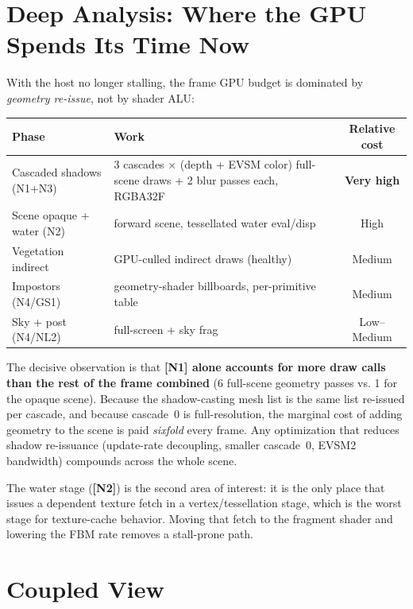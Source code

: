 \documentclass[a4paper,12pt]{article}
\begin{document}
\newpage

\section{Deep Analysis: Where the GPU Spends Its Time Now}

With the host no longer stalling, the frame GPU budget is dominated by
\emph{geometry re-issue}, not by shader ALU:

\begin{center}
\begin{tabular}{lp{7cm}c}
\toprule
\textbf{Phase} & \textbf{Work} & \textbf{Relative cost} \\
\midrule
Cascaded shadows (N1+N3) & 3 cascades × (depth + EVSM color) full-scene draws
  + 2 blur passes each, RGBA32F & \textbf{Very high} \\
Scene opaque + water (N2) & forward scene, tessellated water eval/disp & High \\
Vegetation indirect        & GPU-culled indirect draws (healthy) & Medium \\
Impostors (N4/GS1)         & geometry-shader billboards, per-primitive table & Medium \\
Sky + post (N4/NL2)        & full-screen + sky frag & Low--Medium \\
\bottomrule
\end{tabular}
\end{center}

\noindent The decisive observation is that \textbf{[N1] alone accounts for more
draw calls than the rest of the frame combined} (6 full-scene geometry passes vs.
1 for the opaque scene). Because the shadow-casting mesh list is the same list
re-issued per cascade, and because cascade~0 is full-resolution, the marginal
cost of adding geometry to the scene is paid \emph{sixfold} every frame. Any
optimization that reduces shadow re-issuance (update-rate decoupling, smaller
cascade~0, EVSM2 bandwidth) compounds across the whole scene.

The water stage (\textbf{[N2]}) is the second area of interest: it is the only
place that issues a dependent texture fetch in a vertex/tessellation stage, which
is the worst stage for texture-cache behavior. Moving that fetch to the fragment
shader and lowering the FBM rate removes a stall-prone path.

\section{Coupled View}
\end{document}
